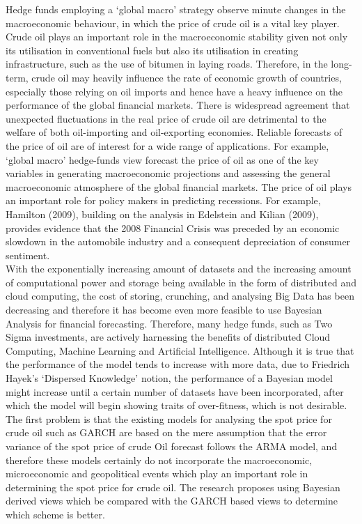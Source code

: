 Hedge funds employing a ‘global macro’ strategy observe minute changes in the macroeconomic behaviour, in which the price of crude oil is a vital key player. Crude oil plays an important role in the macroeconomic stability given not only its utilisation in conventional fuels but also its utilisation in creating infrastructure, such as the use of bitumen in laying roads. Therefore, in the long-term, crude oil may heavily influence the rate of economic growth of countries, especially those relying on oil imports and hence have a heavy influence on the performance of the global financial markets. There is widespread agreement that unexpected fluctuations in the real price of crude oil are detrimental to the welfare of both oil-importing and oil-exporting economies. Reliable forecasts of the price of oil are of interest for a wide range of applications. For example, ‘global macro’ hedge-funds view forecast the price of oil as one of the key variables in generating macroeconomic projections and assessing the general macroeconomic atmosphere of the global financial markets. The price of oil plays an important role for policy makers in predicting recessions. For example, Hamilton (2009), building on the analysis in Edelstein and Kilian (2009), provides evidence that the 2008 Financial Crisis was preceded by an economic slowdown in the automobile industry and a consequent depreciation of consumer sentiment. \\

With the exponentially increasing amount of datasets and the increasing amount of computational power and storage being available in the form of distributed and cloud computing, the cost of storing, crunching, and analysing Big Data has been decreasing and therefore it has become even more feasible to use Bayesian Analysis for financial forecasting. Therefore, many hedge funds, such as Two Sigma investments, are actively harnessing the benefits of distributed Cloud Computing, Machine Learning and Artificial Intelligence. Although it is true that the performance of the model tends to increase with more data, due to Friedrich Hayek’s ‘Dispersed Knowledge’ notion, the performance of a Bayesian model might increase until a certain number of datasets have been incorporated, after which the model will begin showing traits of over-fitness, which is not desirable. \\

The first problem is that the existing models for analysing the spot price for crude oil such as GARCH are based on the mere assumption that the error variance of the  spot price of crude Oil forecast follows the ARMA model, and therefore these models certainly do not incorporate the macroeconomic, microeconomic and geopolitical events which play an important role in determining the spot price for crude oil. The research proposes using Bayesian derived views which be compared with the GARCH based views to determine which scheme is better. \\

